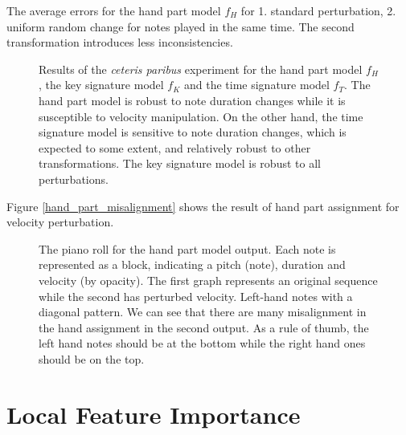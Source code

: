\begin{table}[ht!]

\caption[The average errors for the hand part model]{The average errors for the hand part model $f_H$ for 1. standard perturbation, 2. uniform random change for notes played in the same time. The second transformation introduces less inconsistencies.}
\label{hand_part_perturbations}
\end{table} 

\begin{figure}[!ht]
\centering



\caption[Results of the \emph{ceteris paribus} experiment]{Results of the \emph{ceteris paribus} experiment for the hand part model $f_H$, the key signature model $f_K$ and the time signature model $f_T$. The hand part model is robust to note duration changes while it is susceptible to velocity manipulation. On the other hand, the time signature model is sensitive to note duration changes, which is expected to some extent, and relatively robust to other transformations. The key signature model is robust to all perturbations.}
\label{ceteris_paribus}
\end{figure}

Figure \ref{hand_part_misalignment} shows the result of hand part assignment for velocity perturbation.

\begin{figure}[!ht]
\centering


\caption[The piano roll for the hand part model output.]{The piano roll for the hand part model output. Each note is represented as a block, indicating a pitch (note), duration and velocity (by opacity). The first graph represents an original sequence while the second has perturbed velocity. Left-hand notes with a diagonal pattern. We can see that there are many misalignment in the hand assignment in the second output. As a rule of thumb, the left hand notes should be at the bottom while the right hand ones should be on the top.}\end{figure}

\section{Local Feature Importance}

